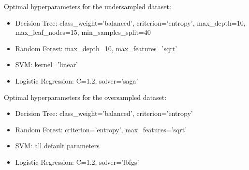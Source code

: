 Optimal hyperparameters for the undersampled dataset:
\begin{itemize}
	\item Decision Tree: class\_weight='balanced', criterion='entropy', max\_depth=10, max\_leaf\_nodes=15, min\_samples\_split=40
	\item Random Forest: max\_depth=10, max\_features='sqrt'
	\item SVM: kernel='linear'
	\item Logistic Regression: C=1.2, solver='saga'
\end{itemize}

Optimal hyperparameters for the oversampled dataset:
\begin{itemize}
	\item Decision Tree: class\_weight='balanced', criterion='entropy'
	\item Random Forest: criterion='entropy', max\_features='sqrt'
	\item SVM: all default parameters
	\item Logistic Regression: C=1.2, solver='lbfgs'
\end{itemize}
